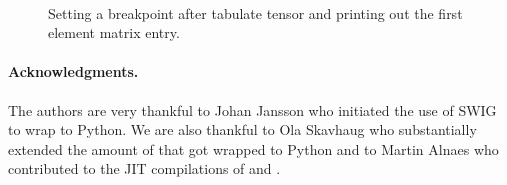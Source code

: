 \begin{figure}
   \\
\caption{Setting a breakpoint after tabulate tensor and printing out the first element matrix entry.}
\label{fig5}
\end{figure}

\paragraph{Acknowledgments.}
The authors are very thankful to Johan Jansson who initiated the use of SWIG to wrap \dolfin to Python. We are also thankful to Ola Skavhaug who substantially extended the amount of \dolfin that got wrapped to Python and to Martin Alnaes who contributed to the JIT compilations of  and .

